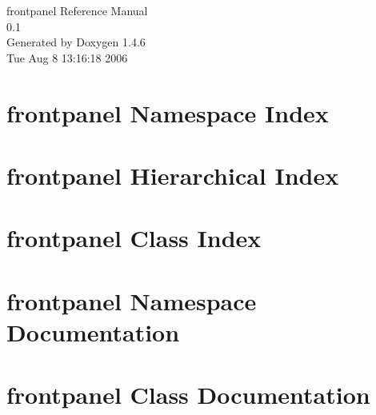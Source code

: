 \documentclass[a4paper]{book}
\begin{document}
\begin{titlepage}
\vspace*{7cm}
\begin{center}
{\Large frontpanel Reference Manual\\[1ex]\large 0.1 }\\
\vspace*{1cm}
{\large Generated by Doxygen 1.4.6}\\
\vspace*{0.5cm}
{\small Tue Aug 8 13:16:18 2006}\\
\end{center}
\end{titlepage}
\clearemptydoublepage
{}
\tableofcontents
\clearemptydoublepage
{}
\chapter{frontpanel Namespace Index}

\chapter{frontpanel Hierarchical Index}

\chapter{frontpanel Class Index}

\chapter{frontpanel Namespace Documentation}







\chapter{frontpanel Class Documentation}















\printindex
\end{document}

